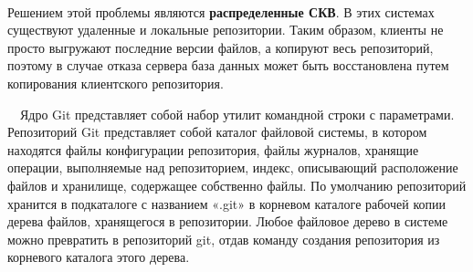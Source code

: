 \documentclass{article}
\begin{document}
~\

Решением этой проблемы являются \textbf{распределенные СКВ}. В этих системах существуют удаленные и локальные репозитории.
Таким образом, клиенты не просто выгружают последние версии файлов, а копируют весь репозиторий, поэтому в случае отказа сервера база данных может быть восстановлена путем копирования клиентского репозитория.


\begin{figure}[h]
\end{figure}

~\
Ядро Git представляет собой набор утилит командной строки с параметрами.
Репозиторий Git представляет собой каталог файловой системы, в котором находятся файлы конфигурации репозитория, файлы журналов, хранящие операции, выполняемые над репозиторием, индекс, описывающий расположение файлов и хранилище, содержащее собственно файлы. По умолчанию репозиторий хранится в подкаталоге с названием «.git» в корневом каталоге рабочей копии дерева файлов, хранящегося в репозитории. Любое файловое дерево в системе можно превратить в репозиторий git, отдав команду создания репозитория из корневого каталога этого дерева.
\end{document}
